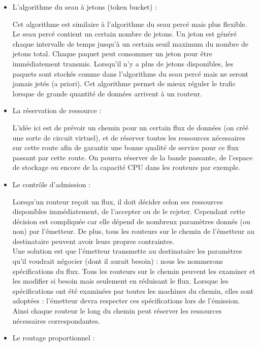 \begin{itemize}
\item L'algorithme du seau à jetons (token bucket) :

Cet algorithme est similaire à l'algorithme du seau percé mais plus flexible. Le seau percé contient un certain nombre de jetons. Un jeton est généré chaque intervalle de temps jusqu'à un certain seuil maximum du nombre de jetons total. Chaque paquet peut consommer un jeton pour être immédiatement transmis. Lorsqu'il n'y a plus de jetons disponibles, les paquets sont stockés comme dans l'algorithme du seau percé mais ne seront jamais jetés (a priori). Cet algorithme permet de mieux réguler le trafic lorsque de grande quantité de données arrivent à un routeur.\\

\item La réservation de ressource :

L'idée ici est de prévoir un chemin pour un certain flux de données (on créé une sorte de circuit virtuel), et de réserver toutes les ressources nécessaires sur cette route afin de garantir une bonne qualité de service pour ce flux passant par cette route. On pourra réserver de la bande passante, de l'espace de stockage ou encore de la capacité CPU dans les routeurs par exemple.\\

\item Le contrôle d'admission :

Lorsqu'un routeur reçoit un flux, il doit décider selon ses ressources disponibles immédiatement, de l'accepter ou de le rejeter. Cependant cette décision est compliquée car elle dépend de nombreux paramètres donnés (ou non) par l'émetteur. De plus, tous les routeurs sur le chemin de l'émetteur au destinataire peuvent avoir leurs propres contraintes.\\
Une solution est que l'émetteur transmette au destinataire les paramètres qu'il voudrait négocier (dont il aurait besoin) : nous les nommerons spécifications du flux. Tous les routeurs sur le chemin peuvent les examiner et les modifier si besoin mais seulement en réduisant le flux. Lorsque les spécifications ont été examinées par toutes les machines du chemin, elles sont adoptées : l'émetteur devra respecter ces spécifications lors de l'émission. Ainsi chaque routeur le long du chemin peut réserver les ressources nécessaires correspondantes.\\

\item Le routage proportionnel :


\end{itemize}

